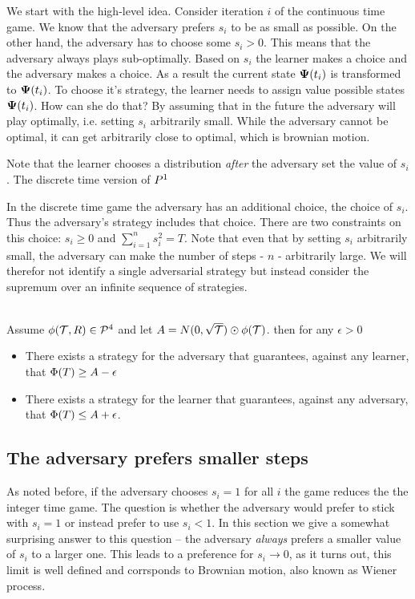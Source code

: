 \documentclass{article}[12pt]
\begin{document}
We start with the high-level idea. Consider iteration $i$ of the
continuous time game. We know that the adversary prefers $s_i$ to be
as small as possible. On the other hand, the adversary has to choose
some $s_i>0$. This means that the adversary always plays
sub-optimally. Based on $s_i$ the learner makes a choice and the
adversary makes a choice. As a result the current state ${\bf \Psi}(t_{i})$
is transformed to ${\bf \Psi}(t_i)$. To choose it's strategy, the learner
needs to assign value possible states ${\bf \Psi}(t_i)$. How can she do
that? By assuming that in the future the adversary will play
optimally, i.e. setting $s_i$ arbitrarily small. While the adversary
cannot be optimal, it can get arbitrarily close to optimal, which is
brownian motion.

Note that the learner chooses a distribution {\em after} the adversary
set the value of $s_i$. The discrete time version of $P^1$

In the discrete time game the adversary has an additional choice, the
choice of $s_i$. Thus the adversary's strategy includes that choice.
There are two constraints on this choice: $s_i \geq 0$ and
$\sum_{i=1}^n s_i^2 = T$. Note that even that by setting $s_i$
arbitrarily small, the adversary can make the number of steps - $n$ -
arbitrarily large. We will therefor not identify a single adversarial
strategy but instead consider the supremum over an infinite sequence
of strategies.

\begin{theorem} \label{thm:seq-of-adv-strategies}
  ~\\
  Assume $\phi(\mathcal{T},R) \in {\cal P}^{4}$ and 
   let $A = N(0,\sqrt{\mathcal{T}}) \odot \phi(\mathcal{T})$. then
   for any $\epsilon>0$
   \begin{itemize}
     \item
    There exists a strategy for the adversary that guarantees, against
    any learner, that $\Phi(T) \geq A-\epsilon$
  \item
    There exists a strategy for the learner that guarantees, against
    any adversary, that $\Phi(T) \leq A+\epsilon$.
  \end{itemize}
\end{theorem}


\subsection{The adversary prefers smaller steps} \label{sec:smallsteps}
As noted before, if the adversary chooses $s_i=1$ for all $i$ the game
reduces the the integer time game. The question is whether the
adversary would prefer to stick with $s_i=1$ or instead prefer to use
$s_i<1$. In this section we give a somewhat surprising answer to this question
-- the adversary {\em always} prefers a smaller value of $s_i$ to a larger
one. This leads to a preference for $s_i \to 0$, as it turns out, this
limit is well defined and corrsponds to Brownian motion, also known as
Wiener process.
\end{document}
